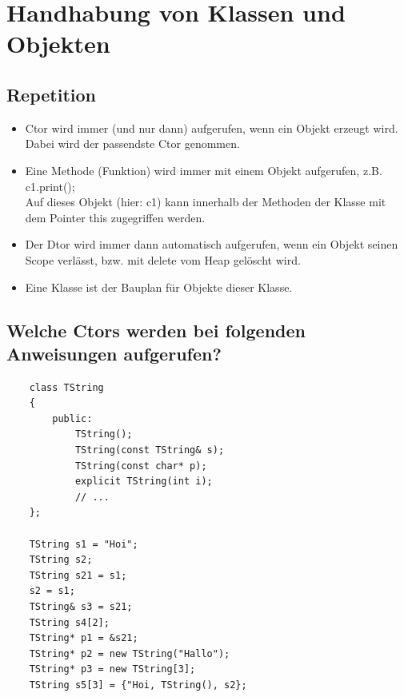 \section{Handhabung von Klassen und Objekten}
\label{sec:Handhabung von Klassen und Objekten}

\subsection{Repetition}
\begin{itemize}
	\item Ctor wird immer (und nur dann) aufgerufen, wenn ein Objekt erzeugt wird. Dabei wird der passendste Ctor genommen.
	\item Eine Methode (Funktion) wird immer mit einem Objekt aufgerufen, z.B. c1.print();\\
	Auf dieses Objekt (hier: c1) kann innerhalb der Methoden der Klasse mit dem Pointer this zugegriffen werden.
	\item Der Dtor wird immer dann automatisch aufgerufen, wenn ein Objekt seinen Scope verlässt, bzw. mit delete vom Heap gelöscht wird.
	\item Eine Klasse ist der Bauplan für Objekte dieser Klasse.
\end{itemize}

\subsection{Welche Ctors werden bei folgenden Anweisungen aufgerufen?}
\label{sec:Welche Ctors werden bei folgenden Anweisungen aufgerufen?}
\noindent
\begin{minipage}{\linewidth}
	\begin{lstlisting}
	class TString
	{
		public:
			TString();
			TString(const TString& s);
			TString(const char* p);
			explicit TString(int i);
			// ...
	};
	
	TString s1 = "Hoi";
	TString s2;
	TString s21 = s1;
	s2 = s1;
	TString& s3 = s21;
	TString s4[2];
	TString* p1 = &s21;
	TString* p2 = new TString("Hallo");
	TString* p3 = new TString[3];
	TString s5[3] = {"Hoi, TString(), s2};
	\end{lstlisting}
\end{minipage}

